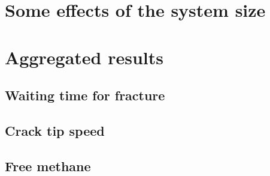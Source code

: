 \section{Some effects of the system size}

\section{Aggregated results}

\subsection{Waiting time for fracture}

\subsection{Crack tip speed}

\subsection{Free methane}

